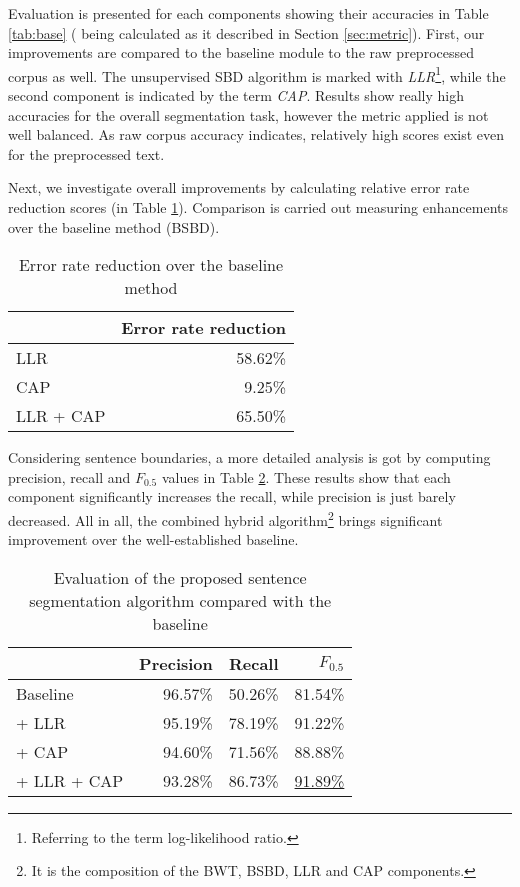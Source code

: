 Evaluation is presented for each components showing their accuracies in Table \ref{tab:base} ( being calculated as it described in Section \ref{sec:metric}).
First, our improvements are compared to the baseline module to the raw preprocessed corpus as well.
The unsupervised SBD algorithm is marked with \emph{LLR}\footnote{Referring to the term log-likelihood ratio.}, while the second component is indicated by the term \emph{CAP}.
Results show really high accuracies for the overall segmentation task, however the metric applied is not well balanced. 
As raw corpus accuracy indicates, relatively high scores exist even for the preprocessed text. 

Next, we investigate overall improvements by calculating relative error rate reduction scores (in Table \ref{tab:reduction}). 
Comparison is carried out measuring enhancements over the baseline method (BSBD). 

\begin{table}[h]
\centering
\caption{Error rate reduction over the baseline method}
\label{tab:reduction}
\begin{tabular}{ l  r } 
\hline
& Error rate reduction\\
\hline
LLR & 58.62\% \\
CAP & 9.25\% \\
LLR + CAP & 65.50\% \\
\hline
\end{tabular}
\end{table}

Considering sentence boundaries, a more detailed analysis is got by computing precision, recall and $F_{0.5}$ values in Table \ref{tab:prec_rec}. 
These results show that each component significantly increases the recall, while precision is just barely decreased. 
All in all, the combined hybrid algorithm\footnote{It is the composition of the BWT, BSBD, LLR and CAP components.} brings significant improvement over the well-established baseline.

\begin{table}[h]
\centering
\caption{Evaluation of the proposed sentence segmentation algorithm compared with the baseline}
\label{tab:prec_rec}
\begin{tabular}{ l r r  r  } 
\hline
& Precision & Recall & $F_{0.5}$ \\
\hline
Baseline & 96.57\% & 50.26\% & 81.54\%  \\
+ LLR & 95.19\% & 78.19\% & 91.22\% \\
+ CAP & 94.60\% & 71.56\% & 88.88\% \\
+ LLR + CAP & 93.28\% & 86.73\% & \underline{91.89\%} \\
\hline
\end{tabular}
\end{table}


